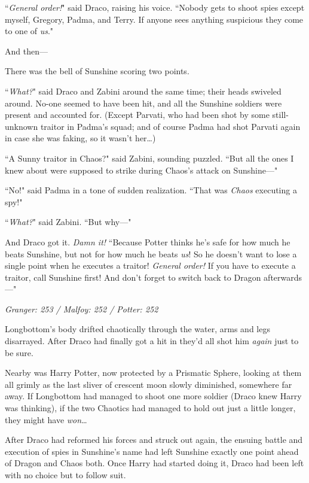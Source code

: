 ``\emph{General order!}" said Draco, raising his voice. ``Nobody gets to shoot spies except myself, Gregory, Padma, and Terry. If anyone sees anything suspicious they come to one of \emph{us}."

And then—

There was the bell of Sunshine scoring two points.

``\emph{What?}" said Draco and Zabini around the same time; their heads swiveled around. No-one seemed to have been hit, and all the Sunshine soldiers were present and accounted for. (Except Parvati, who had been shot by some still-unknown traitor in Padma's squad; and of course Padma had shot Parvati again in case she was faking, so it wasn't her{\ldots})

``A Sunny traitor in Chaos?" said Zabini, sounding puzzled. ``But all the ones I knew about were supposed to strike during Chaos's attack on Sunshine—"

``No!" said Padma in a tone of sudden realization. ``That was \emph{Chaos} executing a spy!"

``\emph{What?}" said Zabini. ``But why—"

And Draco got it. \emph{Damn it!} ``Because Potter thinks he's safe for how much he beats Sunshine, but not for how much he beats \emph{us}! So he doesn't want to lose a single point when he executes a traitor! \emph{General order!} If you have to execute a traitor, call Sunshine first! And don't forget to switch back to Dragon afterwards—"

\later

\emph{Granger: 253 / Malfoy: 252 / Potter: 252}

Longbottom's body drifted chaotically through the water, arms and legs disarrayed. After Draco had finally got a hit in they'd all shot him \emph{again} just to be sure.

Nearby was Harry Potter, now protected by a Prismatic Sphere, looking at them all grimly as the last sliver of crescent moon slowly diminished, somewhere far away. If Longbottom had managed to shoot one more soldier (Draco knew Harry was thinking), if the two Chaotics had managed to hold out just a little longer, they might have \emph{won}{\ldots}

After Draco had reformed his forces and struck out again, the ensuing battle and execution of spies in Sunshine's name had left Sunshine exactly one point ahead of Dragon and Chaos both. Once Harry had started doing it, Draco had been left with no choice but to follow suit.

